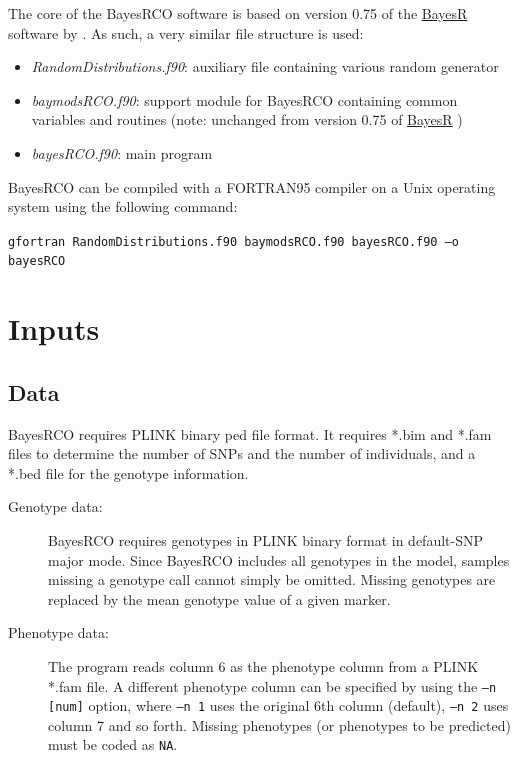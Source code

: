 \documentclass{ol-softwaremanual}
\begin{document}
The core of the BayesRCO software is based on version 0.75 of the \href{https://github.com/syntheke/bayesR/tree/master/old}{BayesR} software by \citet{moser_simultaneous_2015}. As such, a very similar file structure is used: \\
\begin{itemize}
    \item {\it RandomDistributions.f90}: auxiliary file containing various random generator %
 \item {\it baymodsRCO.f90}: support module for BayesRCO containing common variables and routines (note: unchanged from version 0.75 of \href{https://github.com/syntheke/bayesR/tree/master/old}{BayesR} 
)
\item {\it bayesRCO.f90}: main program 
\end{itemize}
BayesRCO can be compiled with a FORTRAN95 compiler on a Unix operating system using the following command:
\noindent
\begin{tcolorbox}
\texttt{gfortran RandomDistributions.f90 baymodsRCO.f90 bayesRCO.f90 –o bayesRCO}
\end{tcolorbox}

\section{Inputs}

\subsection{Data}

BayesRCO requires PLINK binary ped file format. It requires *.bim and *.fam files to determine the number of SNPs and the number of individuals, and a *.bed file for the genotype information.  
\begin{description}
\item[Genotype data:] BayesRCO requires genotypes in PLINK binary format in default-SNP major mode. Since BayesRCO includes all genotypes in the model, samples missing a genotype call cannot simply be omitted. Missing genotypes are replaced by the mean genotype value of a given marker.
\item[Phenotype data:] The program reads column 6 as the phenotype column from a PLINK *.fam file. A different phenotype column can be specified by using the  \texttt{–n [num]} option, where \texttt{–n 1} uses the original 6th column (default), \texttt{–n 2} uses column 7 and so forth. Missing phenotypes (or phenotypes to be predicted) must be coded as \texttt{NA}.
\end{description}
\end{document}
